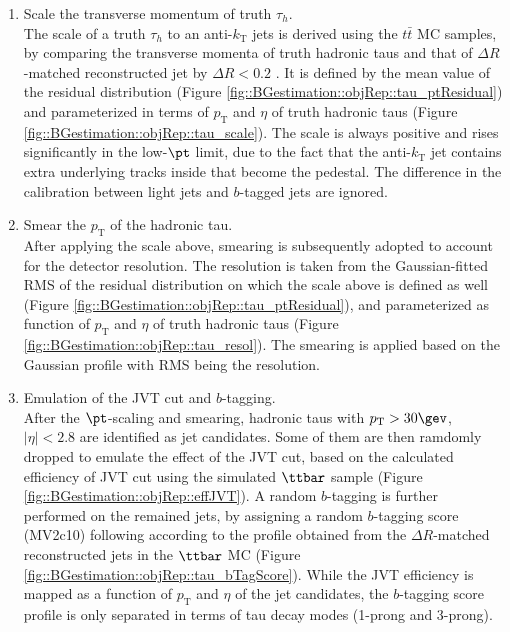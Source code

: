 \begin{enumerate}
\item Scale the transverse momentum of truth $\tau_h$. \\
The scale of a truth $\tau_h$ to an anti-$k_{\mathrm{T}}$ jets is derived using the $t\bar{t}$ MC samples, 
by comparing the transverse momenta of truth hadronic taus and that of $\Delta R$-matched reconstructed jet by $\Delta R<0.2$
. It is defined by the mean value of the residual distribution (Figure \ref{fig::BGestimation::objRep::tau_ptResidual}) and parameterized in terms of $p_{\mathrm{T}}$ and $\eta$ of truth hadronic taus (Figure \ref{fig::BGestimation::objRep::tau_scale}). The scale is always positive and rises significantly in the low-$\pt$ limit, due to the fact that the anti-$k_{\mathrm{T}}$ jet contains extra underlying tracks inside that become the pedestal. The difference in the calibration between light jets and $b$-tagged jets are ignored. \\


\item Smear the $p_{\mathrm{T}}$ of the hadronic tau. \\
After applying the scale above, smearing is subsequently adopted to account for the detector resolution.
The resolution is taken from the Gaussian-fitted RMS of the residual distribution on which the scale above is defined as well (Figure \ref{fig::BGestimation::objRep::tau_ptResidual}), and parameterized as function of $p_{\mathrm{T}}$ and $\eta$ of truth hadronic taus (Figure \ref{fig::BGestimation::objRep::tau_resol}). The smearing is applied based on the Gaussian profile with RMS being the resolution. \\


\item Emulation of the JVT cut and $b$-tagging.  \\
After the $\pt$-scaling and smearing, hadronic taus with $p_{\mathrm{T}}>30\gev$, $|\eta|<2.8$ are identified as jet candidates.
Some of them are then ramdomly dropped to emulate the effect of the JVT cut, based on the calculated efficiency of JVT cut using the simulated $\ttbar$ sample (Figure \ref{fig::BGestimation::objRep::effJVT}).
A random $b$-tagging is further performed on the remained jets, by assigning a random $b$-tagging score (MV2c10) following according to the profile obtained from the $\Delta R$-matched reconstructed jets in the  $\ttbar$ MC (Figure \ref{fig::BGestimation::objRep::tau_bTagScore}). 
%
While the JVT efficiency is mapped as a function of $p_{\mathrm{T}}$ and $\eta$ of the jet candidates, 
the $b$-tagging score profile is only separated in terms of tau decay modes (1-prong and 3-prong).
\end{enumerate}

